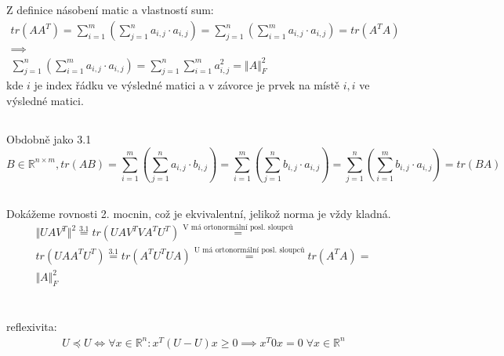 \documentclass[12pt, a4paper]{article}
\begin{document}
\subsection{}
Z definice násobení matic a vlastností sum:
\begin{gather*}
tr(AA^T) = \sum_{i=1}^{m}(\sum_{j=1}^{n} a_{i,j} \cdot a_{i,j}) = \sum_{j=1}^{n}(\sum_{i=1}^{m} a_{i,j} \cdot a_{i,j}) = tr(A^TA) \\
\implies \\
\sum_{j=1}^{n}(\sum_{i=1}^{m} a_{i,j} \cdot a_{i,j}) = \sum_{j=1}^{n}\sum_{i=1}^{m} a_{i,j}^2 = {\Vert A \Vert}_F^2
\end{gather*}
kde $i$ je index řádku ve výsledné matici a v závorce je prvek na místě $i,i$ ve výsledné matici.
\subsection{}
Obdobně jako 3.1
\[ B \in \mathbb{R}^{n \times m}, tr(AB)= \sum_{i=1}^{m}(\sum_{j=1}^{n} a_{i,j} \cdot b_{i,j}) = \sum_{i=1}^{m}(\sum_{j=1}^{n} b_{i,j} \cdot a_{i,j}) = \sum_{j=1}^{n}(\sum_{i=1}^{m} b_{i,j} \cdot a_{i,j}) = tr(BA)\]

\subsection{}
Dokážeme rovnosti 2. mocnin, což je ekvivalentní, jelikož norma je vždy kladná.
\begin{gather*}
\Vert UAV^T \Vert^2 \stackrel{\text{3.1}}{=} tr(UAV^{T}VA^{T}U^{T}) \stackrel{\text{V má ortonormální posl. sloupců}}{=} \\
tr(UAA^{T}U^{T}) \stackrel{\text{3.1}}{=} tr(A^{T}U^{T}UA) \stackrel{\text{U má ortonormální posl. sloupců}}{=} tr(A^TA) = \\
\Vert A \Vert_{F}^2
\end{gather*}

\section{}
\subsection{}
reflexivita:
\begin{gather*}
U \preceq U \iff \forall x \in \mathbb{R}^n: x^T(U - U)x \geq 0 \implies x^T\mathit{0}x=0  \; \forall x \in \mathbb{R}^n
\end{gather*}
\end{document}
